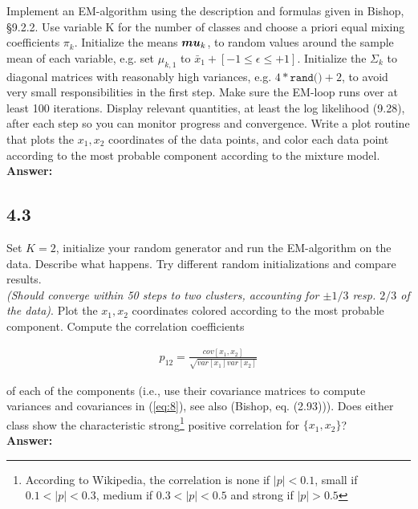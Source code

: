 \documentclass[a4paper]{article}
\begin{document}
Implement an EM-algorithm using the description and formulas given in Bishop, §9.2.2. Use variable K for the number of classes and choose a priori equal mixing coefficients $\pi_k$. Initialize the means $\boldsymbol{\\mu}_k$, to random values around the sample mean of each variable, e.g. set $\mu_{k,1}$ to  $\bar{x}_1 + [-1 \leq \epsilon \leq +1]$. Initialize the $\Sigma_k$ to diagonal matrices with reasonably high variances, e.g. $4*\texttt{rand()}+2$, to avoid very small responsibilities in the first step. Make sure the EM-loop runs over at least 100 iterations. Display relevant quantities, at least the log likelihood (9.28), after each step so you can monitor progress and convergence. Write a plot routine that plots the $x_1, x_2$ coordinates of the data points, and color each data point according to the most probable component according to the mixture model.\\

\textbf{Answer:}\\






\subsection*{4.3}

Set $K = 2$, initialize your random generator and run the EM-algorithm on the data. Describe what happens. Try different random initializations and compare results.\\
\textit{(Should converge within 50 steps to two clusters, accounting for $\pm 1/3$ resp. $2/3$ of the data)}. Plot the $x_1, x_2$ coordinates colored according to the most probable component. Compute the correlation coefficients 

\begin{eqnarray} \label{eq:8}
p_{12} = \frac{cov[x_1, x_2]}{\sqrt{var[x_1] var[x_2]}}
\end{eqnarray}

of each of the components (i.e., use their covariance matrices to compute variances and covariances in (\ref{eq:8}), see also (Bishop, eq. (2.93))). Does either class show the characteristic strong\footnote{According to Wikipedia, the correlation is none if $|p| < 0.1$, small if $0.1 < |p| < 0.3$, medium if $0.3 < |p| < 0.5$ and strong if $|p| > 0.5$} positive correlation for $\{ x_1, x_2\}$?\\


\textbf{Answer:}\\
\end{document}
